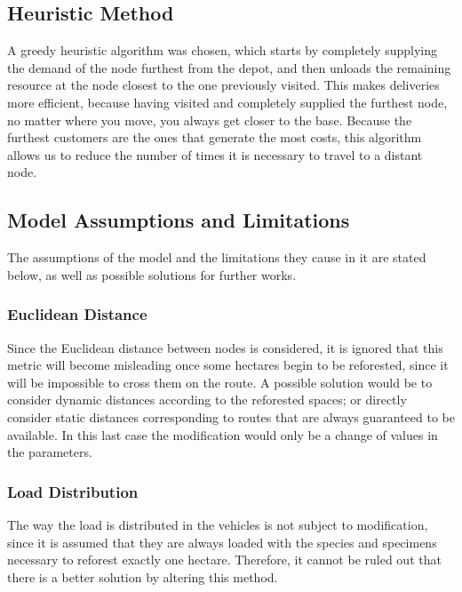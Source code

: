 \documentclass{amsart}
\begin{document}
        \subsection{Heuristic Method}\label{MetodoHeuristico}
        A greedy heuristic algorithm was chosen, which starts by completely supplying the demand of the node furthest from the depot, and then unloads the remaining resource at the node closest to the one previously visited. This makes deliveries more efficient, because having visited and completely supplied the furthest node, no matter where you move, you always get closer to the base. Because the furthest customers are the ones that generate the most costs, this algorithm allows us to reduce the number of times it is necessary to travel to a distant node.
        
        
        \subsection{Model Assumptions and Limitations}
        The assumptions of the model and the limitations they cause in it are stated below, as well as possible solutions for further works.
        
            \subsubsection{Euclidean Distance}
        
            Since the Euclidean distance between nodes is considered, it is ignored that this metric will become misleading once some hectares begin to be reforested, since it will be impossible to cross them on the route. A possible solution would be to consider dynamic distances according to the reforested spaces; or directly consider static distances corresponding to routes that are always guaranteed to be available. In this last case the modification would only be a change of values in the parameters.
            
            \subsubsection{Load Distribution}
            
            The way the load is distributed in the vehicles is not subject to modification, since it is assumed that they are always loaded with the species and specimens necessary to reforest exactly one hectare. Therefore, it cannot be ruled out that there is a better solution by altering this method.
            
\end{document}
